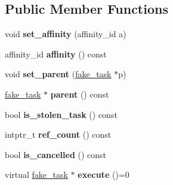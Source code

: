 \subsection*{Public Member Functions}
\begin{DoxyCompactItemize}
\item 
\hypertarget{classtbb_1_1fake__task_a3ebdb7a04b496856939086f0fa20d909}{}void {\bfseries set\+\_\+affinity} (affinity\+\_\+id a)\label{classtbb_1_1fake__task_a3ebdb7a04b496856939086f0fa20d909}

\item 
\hypertarget{classtbb_1_1fake__task_a450f05888c6fab704d769f93ff2f7d6d}{}affinity\+\_\+id {\bfseries affinity} () const \label{classtbb_1_1fake__task_a450f05888c6fab704d769f93ff2f7d6d}

\item 
\hypertarget{classtbb_1_1fake__task_a923e522b5626d51dfcbfbef489ea92d4}{}void {\bfseries set\+\_\+parent} (\hyperlink{classtbb_1_1fake__task}{fake\+\_\+task} $\ast$p)\label{classtbb_1_1fake__task_a923e522b5626d51dfcbfbef489ea92d4}

\item 
\hypertarget{classtbb_1_1fake__task_a9bacadd35fbd6afb5647f8f34f981f76}{}\hyperlink{classtbb_1_1fake__task}{fake\+\_\+task} $\ast$ {\bfseries parent} () const \label{classtbb_1_1fake__task_a9bacadd35fbd6afb5647f8f34f981f76}

\item 
\hypertarget{classtbb_1_1fake__task_ad52a5b60eb4d02c23df5c49bce18c850}{}bool {\bfseries is\+\_\+stolen\+\_\+task} () const \label{classtbb_1_1fake__task_ad52a5b60eb4d02c23df5c49bce18c850}

\item 
\hypertarget{classtbb_1_1fake__task_a1c56c070e18d3d811d91c810ff80af14}{}intptr\+\_\+t {\bfseries ref\+\_\+count} () const \label{classtbb_1_1fake__task_a1c56c070e18d3d811d91c810ff80af14}

\item 
\hypertarget{classtbb_1_1fake__task_a474b1ae93c5cdc68678bbcefaf9570bc}{}bool {\bfseries is\+\_\+cancelled} () const \label{classtbb_1_1fake__task_a474b1ae93c5cdc68678bbcefaf9570bc}

\item 
\hypertarget{classtbb_1_1fake__task_a62d0717c5241c24f92ba8f40fcd2ded8}{}virtual \hyperlink{classtbb_1_1fake__task}{fake\+\_\+task} $\ast$ {\bfseries execute} ()=0\label{classtbb_1_1fake__task_a62d0717c5241c24f92ba8f40fcd2ded8}

\end{DoxyCompactItemize}
